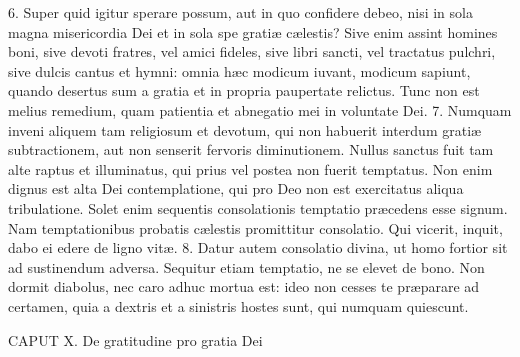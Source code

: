 \documentclass[twoside]{article}
\begin{document}
6. Super quid igitur sperare possum, aut in quo confidere debeo, nisi in sola magna misericordia Dei et in sola spe gratiæ cælestis? Sive enim assint homines boni, sive devoti fratres, vel amici fideles, sive libri sancti, vel tractatus pulchri, sive dulcis cantus et hymni: omnia hæc modicum iuvant, modicum sapiunt, quando desertus sum a gratia et in propria paupertate relictus. Tunc non est melius remedium, quam patientia et abnegatio mei in voluntate Dei.
7. Numquam inveni aliquem tam religiosum et devotum, qui non habuerit interdum gratiæ subtractionem, aut non senserit fervoris diminutionem. Nullus sanctus fuit tam alte raptus et illuminatus, qui prius vel postea non fuerit temptatus. Non enim dignus est alta Dei contemplatione, qui pro Deo non est exercitatus aliqua tribulatione. Solet enim sequentis consolationis temptatio præcedens esse signum. Nam temptationibus probatis cælestis promittitur consolatio. Qui vicerit, inquit, dabo ei edere de ligno vitæ.
8. Datur autem consolatio divina, ut homo fortior sit ad sustinendum adversa. Sequitur etiam temptatio, ne se elevet de bono. Non dormit diabolus, nec caro adhuc mortua est: ideo non cesses te præparare ad certamen, quia a dextris et a sinistris hostes sunt, qui numquam quiescunt.


CAPUT X.
De gratitudine pro gratia Dei
\end{document}
